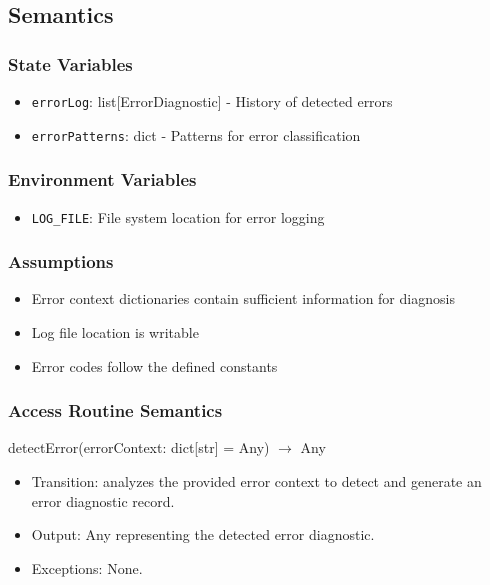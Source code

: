 \documentclass[12pt, titlepage]{article}
\begin{document}
\subsection{Semantics}

\subsubsection{State Variables}
\begin{itemize}
\item \texttt{errorLog}: list[ErrorDiagnostic] - History of detected errors
\item \texttt{errorPatterns}: dict - Patterns for error classification
\end{itemize}

\subsubsection{Environment Variables}

\begin{itemize}
\item \texttt{LOG\_FILE}: File system location for error logging
\end{itemize}

\subsubsection{Assumptions}

\begin{itemize}
\item Error context dictionaries contain sufficient information for diagnosis
\item Log file location is writable
\item Error codes follow the defined constants
\end{itemize}

\subsubsection{Access Routine Semantics}

detectError(errorContext: dict[str] = Any) $\rightarrow$ Any
\begin{itemize}
  \item Transition: analyzes the provided error context to detect and generate an error diagnostic record.
  \item Output: Any representing the detected error diagnostic.
  \item Exceptions: None.
\end{itemize}
\end{document}
